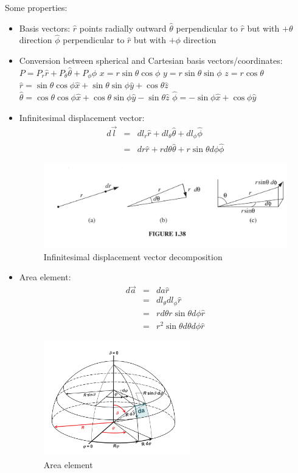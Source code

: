 \documentclass[12pt,a4paper,twoside]{article}
\numberwithin{equation}{section}
\begin{document}
	Some properties:
	\begin{itemize}
		\item Basis vectors:
		\subitem $\hat{r}$ points radially outward
		\subitem $\hat{\theta}$ perpendicular to $\hat{r}$ but with $+\theta$ direction
		\subitem $\hat{\phi}$ perpendicular to $\hat{r}$ but with $+\phi$ direction
		
		\item Conversion between spherical and Cartesian basis vectors/coordinates:
		\subitem \(P=P_r\hat{r}+P_\theta\hat{\theta}+P_\phi\hat{\phi}\)
		\subitem \(x = r\sin\theta\cos\phi\)
		\subitem \(y=r\sin\theta\sin\phi\)
		\subitem \(z=r\cos\theta\)
		\subitem \(\hat{r}=\sin\theta\cos\phi\hat{x}+\sin\theta\sin\phi\hat{y}+\cos\theta\hat{z}\)
		\subitem \(\hat{\theta}=\cos\theta\cos\phi\hat{x}+\cos\theta\sin\phi\hat{y}-\sin\theta\hat{z}\)
		\subitem \(\hat{\phi}=-\sin\phi\hat{x}+\cos\phi\hat{y}\)
		
		\item Infinitesimal displacement vector:
		\begin{eqnarray*}
			d\overrightarrow{l} &=& dl_r\hat{r}+dl_\theta\hat{\theta}+dl_\phi\hat{\phi}\\
			&=& dr\hat{r}+rd\theta \hat{\theta} + r\sin\theta d\phi\hat{\phi}
		\end{eqnarray*}
		\begin{figure}[h]
			\centering
			\includegraphics[width=12cm]{250-Revision/spheric-dl.png}
			\caption{Infinitesimal displacement vector decomposition}
			\label{fig:spheric-dl}
		\end{figure}
		
		\item Area element:
		\begin{eqnarray*}
			d\overrightarrow{a} &=& da\hat{r}\\
			&=& dl_\theta dl_\phi \hat{r} \\
			&=& rd\theta r\sin\theta d\phi\hat{r}\\
			&=& r^2\sin\theta d\theta d\phi \hat{r}
		\end{eqnarray*}
		\begin{figure}[ht]
			\centering
			\includegraphics[height=5cm]{250-Revision/spherical-da.png}
			\caption{Area element}
			\label{fig:spherical-da}
		\end{figure}
		

\end{itemize}
\end{document}
